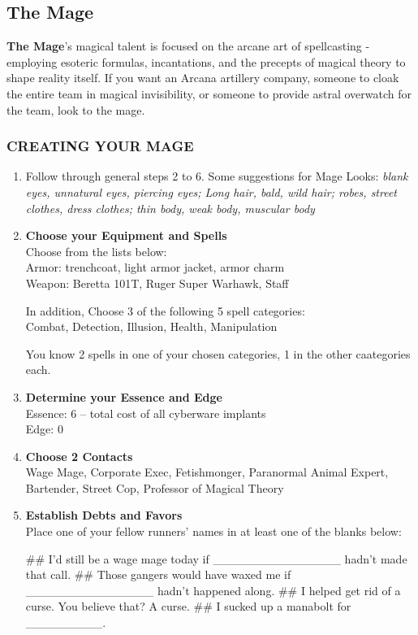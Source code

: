 \clearpage
\subsection{The Mage}
\textbf{The Mage}’s magical talent is focused on the arcane art of spellcasting - employing esoteric formulas, incantations, and the precepts of magical theory to shape reality itself. If you want an Arcana artillery company, someone to cloak the entire team in magical invisibility, or someone to provide astral overwatch for the team, look to the mage.

\subsubsection{CREATING YOUR MAGE}
\begin{enumerate}
    \item Follow through general steps 2 to 6. Some suggestions for Mage Looks: \textit{blank eyes, unnatural eyes, piercing eyes; Long hair, bald, wild hair; robes, street clothes, dress clothes; thin body, weak body, muscular body}
    
    \item \textbf{Choose your Equipment and Spells} \\
    Choose from the lists below: \\
    Armor: trenchcoat, light armor jacket, armor charm \\
    Weapon: Beretta 101T, Ruger Super Warhawk, Staff
    
    In addition, Choose 3 of the following 5 spell categories: \\
    Combat, Detection, Illusion, Health, Manipulation
    
    You know 2 spells in one of your chosen categories, 1 in the other caategories each.
    
    \item \textbf{Determine your Essence and Edge} \\
    Essence: 6 – total cost of all cyberware implants \\
    Edge: 0
    
    \item \textbf{Choose 2 Contacts} \\
    Wage Mage, Corporate Exec, Fetishmonger, Paranormal Animal Expert, Bartender, Street Cop, Professor of Magical Theory
    
    \item \textbf{Establish Debts and Favors} \\
    Place one of your fellow runners’ names in at least one of the blanks below:
        \begin{easylist}
            ## I’d still be a wage mage today if \_\_\_\_\_\_\_\_\_\_\_\_\_\_\_ hadn’t made that call.
            ## Those gangers would have waxed me if \_\_\_\_\_\_\_\_\_\_\_\_\_\_\_ hadn’t happened along.
            ## I helped get rid of a curse. You believe that? A curse.
            ## I sucked up a manabolt for \_\_\_\_\_\_\_\_\_.
        \end{easylist}
    

\end{enumerate}
